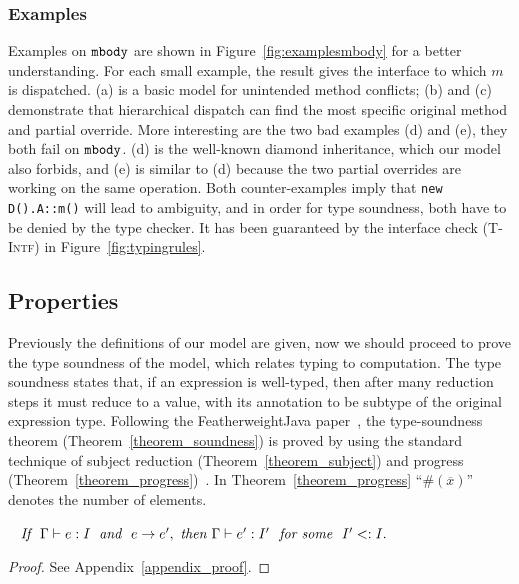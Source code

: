 \subsubsection{Examples}

Examples on $\texttt{mbody}$ are shown in Figure~\ref{fig:examplesmbody} for a better understanding. For each small example, the result
gives the interface to which $m$ is dispatched. (a) is a basic model for unintended method conflicts; (b) and (c) demonstrate
that hierarchical dispatch can find the most specific original method and partial override. More interesting are the two bad examples
(d) and (e), they both fail on $\texttt{mbody}$. (d) is the well-known diamond inheritance, which our model also forbids, and (e) is similar to
(d) because the two partial overrides are working on the same operation. Both counter-examples imply that \lstinline|new D().A::m()| will
lead to ambiguity, and in order for type soundness, both have to be denied by the type checker. It has been guaranteed by the interface check
\textsc{(T-Intf)} in Figure~\ref{fig:typingrules}.

\subsection{Properties}
Previously the definitions of our model are given, now we should proceed to prove the type soundness of 
the model, which relates typing to computation. The type soundness states that, if an expression is 
well-typed, then after many reduction steps it must reduce to a value, with its annotation to be subtype of the original expression type.
Following the FeatherweightJava paper~\cite{Igarashi01FJ}, the type-soundness theorem 
(Theorem~\ref{theorem_soundness}) is proved by using the standard technique of subject reduction (Theorem~\ref{theorem_subject})
and progress (Theorem~\ref{theorem_progress})~\cite{Wright1994}. In Theorem~\ref{theorem_progress} ``$\#(\overline{x})$'' denotes the number of
elements.

\begin{theorem}~\label{theorem_subject}
$\textit{If } \ \judgeewf \Gamma {e : I} \; \textit{ and } \ e \rightarrow e',\ 
\textit{then } \judgeewf \Gamma {e' : I'} \ \textit{ for some } \ I' <: I.$
\end{theorem}
\begin{proof}
See Appendix~\ref{appendix_proof}.
\end{proof}

